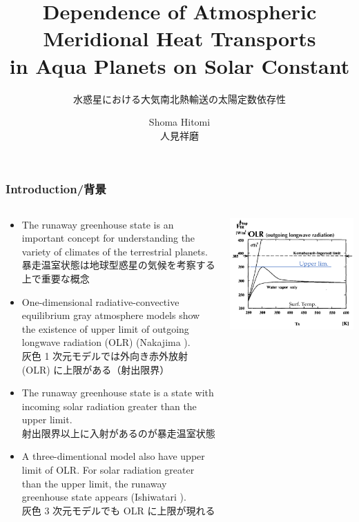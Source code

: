 \documentclass[aspectratio=149,9pt,fleqn,tbtags]{beamer}
\institute{Planetary and Space Group\\北海道大学大学院理学院 宇宙理学専攻 地球流体力学研究室}
\author{Shoma Hitomi\\人見祥磨}
\title{Dependence of Atmospheric Meridional Heat Transports\\in Aqua Planets on Solar Constant}
\subtitle{水惑星における大気南北熱輸送の太陽定数依存性}
\newcommand{\jp}[1]{{\footnotesize #1}}
\begin{document}
\maketitle

\begin{frame}
	\frametitle{Introduction/背景}
	\begin{columns}[T]
		\begin{column}{.6\textwidth}
			\begin{itemize}
				\item The runaway greenhouse state is an important concept for
					understanding the variety of climates of the terrestrial planets.\\
					\jp{暴走温室状態は地球型惑星の気候を考察する上で重要な概念}
				\item One-dimensional radiative-convective equilibrium gray atmosphere models
					show the existence of upper limit of outgoing longwave radiation (OLR)
					(Nakajima ).\\
					\jp{灰色 1 次元モデルでは外向き赤外放射 (OLR) に上限がある（射出限界）}
				\item The runaway greenhouse state is a state with incoming solar radiation
					greater than the upper limit.\\
					\jp{射出限界以上に入射があるのが暴走温室状態}
				\item A three-dimentional model also have upper limit of OLR.
					For solar radiation greater than the upper limit, the runaway
					greenhouse state appears (Ishiwatari ).\\
					\jp{灰色 3 次元モデルでも OLR に上限が現れる}
			\end{itemize}
		\end{column}
		\begin{column}{.35\textwidth}
			\centering\scriptsize
			\includegraphics[width=.9\textwidth]{fig-n1992.pdf}\\

\end{column}
\end{columns}
\end{frame}
\end{document}
